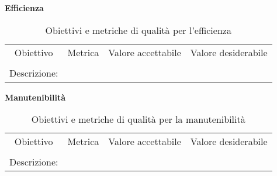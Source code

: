 \documentclass[../piano-di-qualifica.tex]{subfiles}
\begin{document}
    \begin{center}
        \centering
        \textbf{Efficienza}
    \end{center}
        \begin{table}[H]
            \centering
            \begin{tabular}{cccc}
            Obiettivo    & Metrica & Valore accettabile & Valore desiderabile \\
                         &         &                    &                    \\
            Descrizione: & \multicolumn{3}{c}{}        
            \end{tabular}
            \caption{Obiettivi e metriche di qualità per l'efficienza}
        \end{table}
        
    \begin{center}
        \centering
        \textbf{Manutenibilità}
    \end{center}
        \begin{table}[H]
            \centering
            \begin{tabular}{cccc}
            Obiettivo    & Metrica & Valore accettabile & Valore desiderabile \\
                         &         &                    &                    \\
            Descrizione: & \multicolumn{3}{c}{}        
            \end{tabular}
            \caption{Obiettivi e metriche di qualità per la manutenibilità}
        \end{table}
\end{document}
